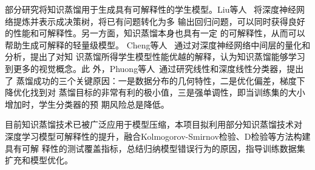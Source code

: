 部分研究将知识蒸馏用于生成具有可解释性的学生模型。Liu等人
~将深度神经网络提炼并表示成决策树，将已有问题转化为多
输出回归问题，可以同时获得良好的性能和可解释性。另一方面，知识蒸馏本身也具有一定
的可解释性，从而可以帮助生成可解释的轻量级模型。 Cheng等人
~通过对深度神经网络中间层的量化和分析，提出了对知
识蒸馏所得学生模型性能优越的解释，认为知识蒸馏能够学习到更多的视觉概念。此
外，Phuong等人~通过研究线性和深度线性分类器，提出了
蒸馏成功的三个关键原因：一是数据分布的几何特性，二是优化偏差，梯度下降优化找到对
蒸馏目标的非常有利的极小值，三是强单调性，即当训练集的大小增加时，学生分类器的预
期风险总是降低。


{\kaishu 目前知识蒸馏技术已被广泛应用于模型压缩，本项目拟利用部分知识蒸馏技术对
深度学习模型可解释性的提升，融合Kolmogorov-Smirnov检验、D检验等方法构建具有可解
释性的测试覆盖指标，总结归纳模型错误行为的原因，指导训练数据集扩充和模型优化。}








\begin{spacing}{1.3} %
	 \songti
	
	
	\vspace{11bp}
\end{spacing}
